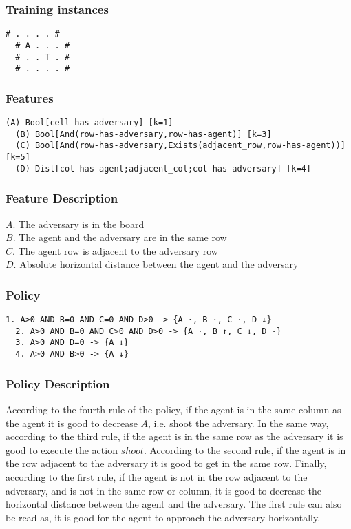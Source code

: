 \documentclass[a4paper]{article}
\begin{document}
\subsubsection{Training instances}
\begin{Verbatim}[fontsize=\footnotesize]
  # . . . . #
  # A . . . #
  # . . T . #
  # . . . . #
\end{Verbatim}

\subsubsection{Features}
\begin{Verbatim}[fontsize=\footnotesize]
  (A) Bool[cell-has-adversary] [k=1]
  (B) Bool[And(row-has-adversary,row-has-agent)] [k=3]
  (C) Bool[And(row-has-adversary,Exists(adjacent_row,row-has-agent))] [k=5]
  (D) Dist[col-has-agent;adjacent_col;col-has-adversary] [k=4]
\end{Verbatim}

\subsubsection{Feature Description}
$A$. The adversary is in the board\\
$B$. The agent and the adversary are in the same row\\
$C$. The agent row is adjacent to the adversary row\\
$D$. Absolute horizontal distance between the agent and the adversary

\subsubsection{Policy}
\begin{Verbatim}[fontsize=\footnotesize]
  1. A>0 AND B=0 AND C=0 AND D>0 -> {A ·, B ·, C ·, D ↓}
  2. A>0 AND B=0 AND C>0 AND D>0 -> {A ·, B ↑, C ↓, D ·}
  3. A>0 AND D=0 -> {A ↓}
  4. A>0 AND B>0 -> {A ↓}
\end{Verbatim}

\subsubsection{Policy Description}
According to the fourth rule of the policy, if the agent is in the same column as the agent it is good to decrease $A$, i.e. shoot the adversary. In the same way, according to the third rule, if the agent is in the same row as the adversary it is good to execute the action $shoot$. According to the second rule, if the agent is in the row adjacent to the adversary it is good to get in the same row. Finally, according to the first rule, if the agent is not in the row adjacent to the adversary, and is not in the same row or column, it is good to decrease the horizontal distance between the agent and the adversary. The first rule can also be read as, it is good for the agent to approach the adversary horizontally.
\end{document}
